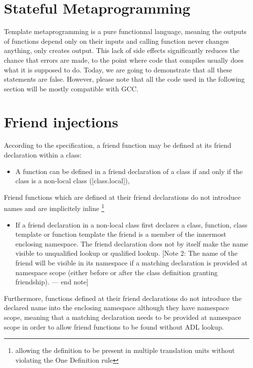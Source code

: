 
\section*{Stateful Metaprogramming}

Template metaprogramming is a pure functionnal language, meaning the outputs of functions depend only on their inputs and calling function never changes anything, only creates output. This lack of side effects significantly reduces the chance that errors are made, to the point where code that compiles usually does what it is supposed to do. Today, we are going to demonstrate that all these statements are false. However, please note that all the code used in the following section will be mostly compatible with GCC.

\hrulefill

\section*{Friend injections}

According to the specification, a friend function may be defined at its friend declaration within a class:
\begin{itemize}
	\item A function can be defined in a friend declaration of a class if and only if the class is a non-local class ([class.local]), 
\end{itemize}

Friend functions which are defined at their friend declarations do not introduce names and are implicitely inline 
\footnote{allowing the definition to be present in multiple translation units without violating the One Definition rule}

\begin{itemize}
	\item If a friend declaration in a non-local class first declares a class, function, class template or function template the friend is 
		a member of the innermost enclosing namespace.
		The friend declaration does not by itself make the name visible to unqualified lookup or qualified lookup.
		[Note 2: The name of the friend will be visible in its namespace if a matching declaration is provided at namespace 
		scope (either before or after the class definition granting friendship). — end note]
\end{itemize}

Furthermore, functions defined at their friend declarations do not introduce the declared name into the enclosing namespace although they have namespace scope, meaning that a matching declaration needs to be provided at namespace scope in order to allow friend functions to be
found without ADL lookup.

